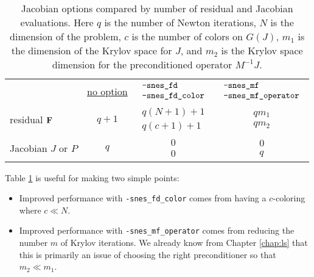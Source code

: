 \begin{table}
\begin{tabular}{lccc}
 &\underline{no option}
                       & \small\underline{$\begin{array}{ll} \text{\texttt{-snes\_fd}} \\ \text{\texttt{-snes\_fd\_color}} \end{array}$}
                                    & \small\underline{$\begin{array}{ll} \text{\texttt{-snes\_mf}} \\ \text{\texttt{-snes\_mf\_operator}} \end{array}$} \vspace{0.2in} \\
residual $\mathbf{F}$        & $q+1$ & $\begin{array}{cc} q(N+1)+1 \\ q(c+1)+1 \end{array}$ & $\begin{array}{cc} q m_1 \\ q m_2 \end{array}$ \vspace{0.1in} \\
Jacobian $J$ or $P$    & $q$ & $\begin{array}{cc} 0 \\ 0 \end{array}$ & $\begin{array}{cc} 0 \\ q \end{array}$
\end{tabular}
\caption{Jacobian options compared by number of residual and Jacobian evaluations.  Here $q$ is the number of Newton iterations, $N$ is the dimension of the problem, $c$ is the number of colors on $G(J)$, $m_1$ is the dimension of the Krylov space for $J$, and $m_2$ is the Krylov space dimension for the preconditioned operator $M^{-1}J$.} \label{tab:snesjacobianoptions:evals}
\end{table}

Table \ref{tab:snesjacobianoptions:evals} is useful for making two simple points:\begin{itemize}
\item Improved performance with \texttt{-snes\_fd\_color} comes from having a $c$-coloring where $c \ll N$.
\item Improved performance with \texttt{-snes\_mf\_operator} comes from reducing the number $m$ of Krylov iterations.  We already know from Chapter \ref{chap:ls} that this is primarily an issue of choosing the right preconditioner so that $m_2 \ll m_1$.
\end{itemize}


